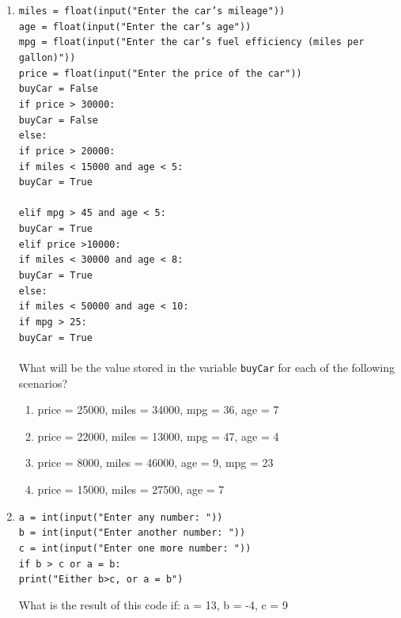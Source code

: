 \documentclass{article}
\begin{document}
\begin{enumerate}
\item \texttt{miles = float(input("Enter the car's mileage"))}\\ \texttt{age = float(input("Enter the car's age"))}\\ \texttt{mpg = float(input("Enter the car's fuel efficiency (miles per gallon)"))}\\ \texttt{price = float(input("Enter the price of the car"))}\\
\texttt{buyCar = False}\\
\texttt{if price > 30000:}\\ \null\quad\texttt{buyCar = False}\\
\texttt{else:}\\
\null\quad\texttt{if price > 20000:}\\ 
\null\quad\quad\texttt{if miles < 15000 and age < 5:}\\ \null\quad\quad\quad\texttt{buyCar = True}\\ \\ \null\quad\quad \texttt{elif mpg > 45 and age < 5:}\\ \null\quad\quad\quad\texttt{buyCar = True}\\ \null\quad\texttt{elif price >10000:}\\ \null\quad\quad\texttt{if miles < 30000 and age < 8:}\\ \null\quad\quad\quad\texttt{buyCar = True}\\ \null\quad\texttt{else:}\\ \null\quad\quad\texttt{if miles < 50000 and age < 10:}\\\null\quad\quad\quad \texttt{if mpg > 25:}\\ \null\quad\quad\quad\quad\texttt{buyCar = True}\\ \\
What will be the value stored in the variable \texttt{buyCar} for each of the following scenarios?
\begin{enumerate}
	\item price = 25000, miles = 34000, mpg = 36, age = 7
	\item price = 22000, miles = 13000, mpg = 47, age = 4
	\item price = 8000, miles = 46000, age = 9, mpg = 23
	\item price = 15000, miles = 27500, age = 7
\end{enumerate}

\item 
\texttt{a = int(input("Enter any number: "))}\\
\texttt{b = int(input("Enter another number: "))}\\
\texttt{c = int(input("Enter one more number: "))}\\
\texttt{if b > c or a = b:}\\
\null\quad\texttt{print("Either b>c, or a = b")}

What is the result of this code if: a = 13, b = -4, c = 9
\end{enumerate}
\end{document}
